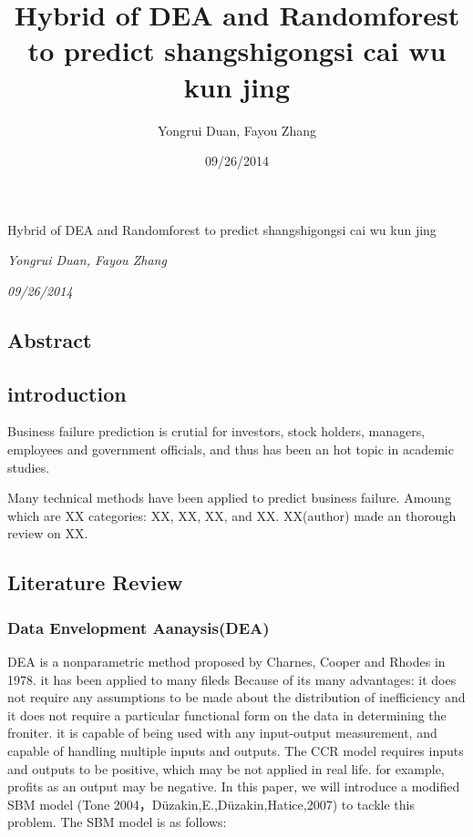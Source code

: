 \documentclass[]{article}
\title{Hybrid of DEA and Randomforest to predict shangshigongsi cai wu kun jing}
\author{Yongrui Duan, Fayou Zhang}
\date{09/26/2014}
\begin{document}
\begin{center}
\huge Hybrid of DEA and Randomforest to predict shangshigongsi cai wu kun jing \\[0.2cm]
\end{center}
\begin{center}
\large \emph{Yongrui Duan, Fayou Zhang}\\[0.1cm]
\end{center}
\begin{center}
\large \emph{09/26/2014} \\
\end{center}
\normalsize


\subsection{Abstract}\label{abstract}

\subsection{introduction}\label{introduction}

Business failure prediction is crutial for investors, stock holders,
managers, employees and government officials, and thus has been an hot
topic in academic studies.

Many technical methods have been applied to predict business failure.
Amoung which are XX categories: XX, XX, XX, and XX. XX(author) made an
thorough review on XX.

\subsection{Literature Review}\label{literature-review}

\subsubsection{Data Envelopment
Aanaysis(DEA)}\label{data-envelopment-aanaysisdea}

DEA is a nonparametric method proposed by Charnes, Cooper and Rhodes in
1978. it has been applied to many fileds Because of its many advantages:
it does not require any assumptions to be made about the distribution of
inefficiency and it does not require a particular functional form on the
data in determining the froniter. it is capable of being used with any
input-output measurement, and capable of handling multiple inputs and
outputs. The CCR model requires inputs and outputs to be positive, which
may be not applied in real life. for example, profits as an output may
be negative. In this paper, we will introduce a modified SBM model (Tone
2004，Düzakin,E.,Düzakin,Hatice,2007) to tackle this problem. The SBM
model is as follows:
\end{document}
